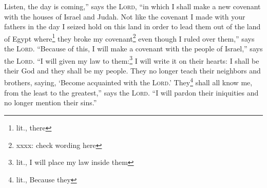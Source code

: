 
\begin{inparaenum}
     Listen, the day is coming,'' says the \textsc{Lord}, ``in which I shall make a new covenant with the houses of Israel and Judah.%
     Not like the covenant I made with your fathers in the day I seized hold on this land in order to lead them out of the land of Egypt where\footnote{lit., there} they broke my covenant\footnote{xxxx: check wording here} even though I ruled over them,'' says the \textsc{Lord}.%
     ``Because of this, I will make a covenant with the people of Israel,'' says the \textsc{Lord}. ``I will given my law to them:\footnote{lit., I will place my law inside them} I will write it on their hearts: I shall be their God and they shall be my people.%
     They no longer teach their neighbors and brothers, saying, `Become acquainted with the \textsc{Lord}.' They\footnote{lit., Because they} shall all know me, from the least to the greatest,'' says the \textsc{Lord}. ``I will pardon their iniquities and no longer mention their sins.''%
\end{inparaenum}
